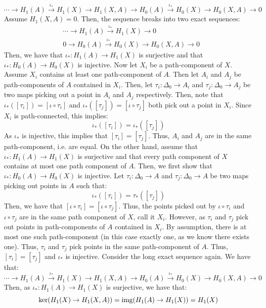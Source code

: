 \documentclass[12pt]{article}
\begin{document}
\begin{solution}
\begin{enumerate}
        \[ \cdots \to H_1(A) \xrightarrow{\iota_*} H_1(X) \to H_1(X, A) \to H_0(A) \xrightarrow{\iota_*} H_0(X) \to H_0(X, A) \to 0 \]
        Assume $H_1(X, A) = 0$. Then, the sequence breaks into two exact sequences:
        \begin{align*}
            &\cdots \to H_1(A) \xrightarrow{\iota_*} H_1(X) \to 0 \\
            &0 \to H_0(A) \xrightarrow{\iota_*} H_0(X) \to H_0(X, A) \to 0
        \end{align*}
        Then, we have that $\iota_*: H_1(A) \to H_1(X)$ is surjective and that $\iota_*: H_0(A) \to H_0(X)$ is injective. Now let $X_i$ be a path-component of $X$. Assume $X_i$ contains at least one path-component of $A$. Then let $A_i$ and $A_j$ be path-components of $A$ contained in $X_i$. Then, let $\tau_i: \Delta_0 \to A_i$ and $\tau_j: \Delta_0 \to A_j$ be two maps picking out a point in $A_i$ and $A_j$ respectively. Then, note that $\iota_*([\tau_i]) = [\iota \circ \tau_i]$ and $\iota_*([\tau_j]) = [\iota \circ \tau_j]$ both pick out a point in $X_i$. Since $X_i$ is path-connected, this implies:
        \[\iota_*([\tau_i]) = \iota_*([\tau_j])\]
        As $\iota_*$ is injective, this implies that $[\tau_i] = [\tau_j]$. Thus, $A_i$ and $A_j$ are in the same path-component, i.e. are equal. \bbni 
        On the other hand, assume that $\iota_*: H_1(A) \to H_1(X)$ is surjective and that every path component of $X$ contains at most one path component of $A$. Then, we first show that $\iota_*: H_0(A) \to H_0(X)$ is injective. \bbni
        Let $\tau_i: \Delta_0 \to A$ and $\tau_j: \Delta_0 \to A$ be two maps picking out points in $A$ such that: 
        \[ \iota_*([\tau_i]) = \tau_*([\tau_j])\]
        Then, we have that $[\iota \circ \tau_i] = [\iota \circ \tau_j]$. Thus, the points picked out by $\iota \circ \tau_i$ and $\iota \circ \tau_j$ are in the same path component of $X$, call it $X_i$. However, as $\tau_i$ and $\tau_j$ pick out points in path-components of $A$ contained in $X_i$. By assumption, there is at most one such path-component (in this case exactly one, as we know there exists one). Thus, $\tau_i$ and $\tau_j$ pick points in the same path-component of $A$. Thus, $[\tau_i] = [\tau_j]$ and $\iota_*$ is injective. \bbni
        Consider the long exact sequence again. We have that:
        \[ \cdots \to H_1(A) \xrightarrow{\iota_*} H_1(X) \to H_1(X, A) \to H_0(A) \xrightarrow{\iota_*} H_0(X) \to H_0(X, A) \to 0 \]
        Then, as $\iota_*: H_1(A) \to H_1(X)$ is surjective, we have that:
        \[\ker(H_1(X) \to H_1(X,A)) = \operatorname{img}(H_1(A) \to H_1(X)) = H_1(X)\]

\end{enumerate}
\end{solution}
\end{document}
